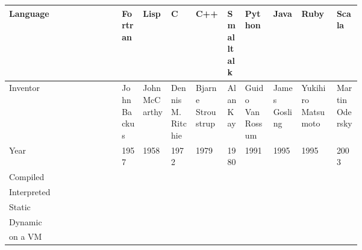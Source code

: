 \documentclass[12pt, a4paper]{article}
\newcommand{\cmark}{\textcolor{green!65!black}{\ding{51}}}
\newcommand{\xmark}{\textcolor{red!90!black}{\ding{55}}}
\begin{document}
{\tiny
\noindent\begin{tabular}{lp{0.06\linewidth}p{0.08\linewidth}p{0.07\linewidth}p{0.09\linewidth}p{0.05\linewidth}p{0.08\linewidth}p{0.08\linewidth}p{0.1\linewidth}p{0.07\linewidth}}
    Language    & Fortran     & Lisp          & C                 & C++               & Smalltalk & Python           & Java          & Ruby               & Scala \\
    \toprule
    Inventor    & John Backus & John McCarthy & Dennis M. Ritchie & Bjarne Stroustrup & Alan Kay  & Guido Van Rossum & James Gosling & Yukihiro Matsumoto & Martin Odersky \\
    \midrule
    Year        & 1957        & 1958          & 1972              & 1979              & 1980      & 1991             & 1995          & 1995               & 2003 \\
    \midrule
    Compiled    & \cmark{}    & \xmark{}      & \cmark{}          & \cmark{}          & \cmark{}  & \cmark{}         & \cmark{}      & \xmark{}           & \cmark{} \\
    \midrule
    Interpreted & \xmark{}    & \cmark{}      & \xmark{}          & \xmark{}          & \xmark{}  & \cmark{}         & \cmark{}      & \cmark{}           & \cmark{} \\
    \midrule
    Static      & \cmark{}    & \xmark{}      & \cmark{}          & \cmark{}          & \xmark{}  & \xmark{}         & \cmark{}      & \xmark{}           & \cmark{} \\
    \midrule
    Dynamic     & \xmark{}    & \cmark{}      & \xmark{}          & \xmark{}          & \cmark{}  & \cmark{}         & \xmark{}      & \cmark{}           & \xmark{} \\
    \midrule
    on a VM     &             &               & \xmark{}          & \xmark{}          & \cmark{}  & \cmark{}         & \cmark{}      & \cmark{}           & \cmark{} \\
    \bottomrule
\end{tabular}
}

\end{document}
